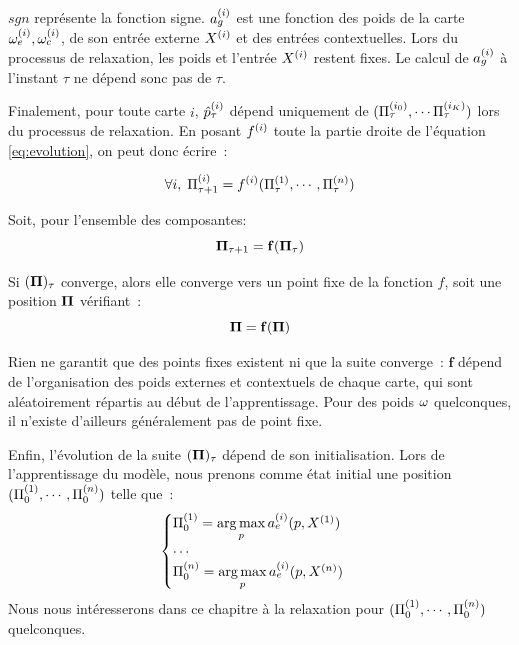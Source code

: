 \documentclass[../main]{subfiles}
\begin{document}
$sgn$ représente la fonction signe.
$a_g^{({i})}$ est une fonction des poids de la carte $\omega_{e}^{({i})}, \omega_{c}^{({i})}$, de son entrée externe $X^{({i})}$ et des entrées contextuelles.
Lors du processus de relaxation, les poids et l'entrée $X^{({i})}$ restent fixes. 
Le calcul de $a_g^{({i})}$ à l'instant $\tau$ ne dépend sonc pas de $\tau$.

Finalement, pour toute carte $i$, $\hat{p}^{({i})}_{\tau}$ dépend uniquement de $(\Pi^{({i_0})}_\tau, \cdots \Pi^{({i_K})}_\tau)$ lors du processus de relaxation.
En posant $f^{({i})}$ toute la partie droite de l'équation \ref{eq:evolution}, on peut donc écrire~:

\begin{equation}
\forall i, \; \Pi^{({i})}_{\tau +1} = f^{({i})}(\Pi^{({1})}_\tau,\cdots,\Pi^{({n})}_\tau)
\label{eq:fonction}
\end{equation}

Soit, pour l'ensemble des composantes: 
\begin{equation}\label{eq:f}
\mathbf{\Pi}_{\tau+1} = \mathbf{f}(\mathbf{\Pi}_\tau)
\end{equation}

Si $(\mathbf{\Pi})_\tau$ converge, alors elle converge vers un point fixe de la fonction $f$, soit une position $\mathbf{\Pi}$ vérifiant~:
\begin{equation}
\mathbf{\Pi} = \mathbf{f}(\mathbf{\Pi})
\label{eq:suite}
\end{equation}

Rien ne garantit que des points fixes existent ni que la suite converge~: $\mathbf{f}$ dépend de l'organisation des poids externes et contextuels de chaque carte, qui sont aléatoirement répartis au début de l'apprentissage.
Pour des poids $\omega$ quelconques, il n'existe d'ailleurs généralement pas de point fixe.

Enfin, l'évolution de la suite $(\mathbf{\Pi})_{\tau}$ dépend de son initialisation.
Lors de l'apprentissage du modèle, nous prenons comme état initial une position $(\Pi^{({1})}_0, \cdots , \Pi^{({n})}_0)$  telle que~: 
\begin{equation}
\begin{cases}
\Pi^{({1})}_0 = \operatorname*{arg\,max}\limits_p a_e^{({i})}(p,X^{({1})})\\
\cdots \\
\Pi^{({n})}_0 = \operatorname*{arg\,max}\limits_p a_e^{({i})}(p,X^{({n})})\\
\end{cases}
\label{eq:init}
\end{equation}
Nous nous intéresserons dans ce chapitre à la relaxation pour $(\Pi^{({1})}_0, \cdots , \Pi^{({n})}_0)$ quelconques.
\end{document}
